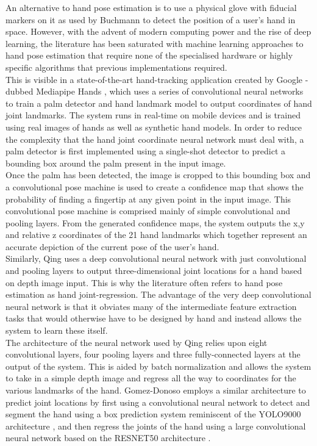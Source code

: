 An alternative to hand pose estimation is to use a physical glove with fiducial markers on it as used by Buchmann \cite{fingartips} to detect the position of a user’s hand in space. However, with the advent of modern computing power and the rise of deep learning, the literature has been saturated with machine learning approaches to hand pose estimation that require none of the specialised hardware or highly specific algorithms that previous implementations required. \\

This is visible in a state-of-the-art hand-tracking application created by Google - dubbed Mediapipe Hands \cite{mediapipe_hands}, which uses a series of convolutional neural networks to train a palm detector and hand landmark model to output coordinates of hand joint landmarks. The system runs in real-time on mobile devices and is trained using real images of hands as well as synthetic hand models. In order to reduce the complexity that the hand joint coordinate neural network must deal with, a palm detector is first implemented using a single-shot detector to predict a bounding box around the palm present in the input image.\\

Once the palm has been detected, the image is cropped to this bounding box and a convolutional pose machine is used to create a confidence map that shows the probability of finding a fingertip at any given point in the input image. This convolutional pose machine is comprised mainly of simple convolutional and pooling layers. From the generated confidence maps, the system outputs the x,y and relative z coordinates of the 21 hand landmarks which together represent an accurate depiction of the current pose of the user's hand. \\

Similarly, Qing \cite{deep_cnn} uses a deep convolutional neural network with just convolutional and pooling layers to output three-dimensional joint locations for a hand based on depth image input. This is why the literature often refers to hand pose estimation as hand joint-regression. The advantage of the very deep convolutional neural network is that it obviates many of the intermediate feature extraction tasks that would otherwise have to be designed by hand and instead allows the system to learn these itself. \\

The architecture of the neural network used by Qing relies upon eight convolutional layers, four pooling layers and three fully-connected layers at the output of the system. This is aided by batch normalization and allows the system to take in a simple depth image and regress all the way to coordinates for the various landmarks of the hand. Gomez-Donoso \cite{hand_pose_rgb_camera} employs a similar architecture to predict joint locations by first using a convolutional neural network to detect and segment the hand using a box prediction system reminiscent of the YOLO9000 architecture \cite{yolo_9000}, and then regress the joints of the hand using a large convolutional neural network based on the RESNET50 architecture \cite{resnet_50}.\\

